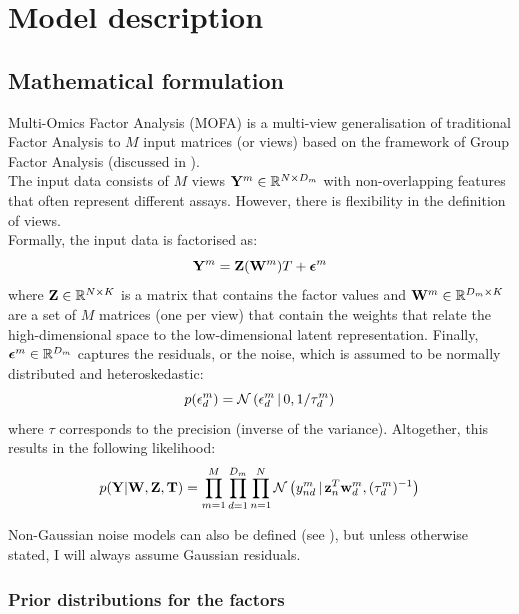 \graphicspath{{Chapter2/Figs/}}

\section{Model description} \label{mofa:model_description}

\subsection{Mathematical formulation}

Multi-Omics Factor Analysis (MOFA) is a multi-view generalisation of traditional Factor Analysis to $M$ input matrices (or views) based on the framework of Group Factor Analysis (discussed in ).\\
The input data consists of $M$ views ${\bf Y}^m \in \mathbb{R}^{N \times D_m}$ with non-overlapping features that often represent different assays. However, there is flexibility in the definition of views.\\
Formally, the input data is factorised as:
\begin{equation} \label{mofa_master_equation}
	\mathbf{Y}^m = \mathbf{Z}(\mathbf{W}^{m}){T} + \mbox{\boldmath $\epsilon$}^m
\end{equation}
where ${\bf Z} \in \mathbb{R}^{N \times K}$ is a matrix that contains the factor values and ${\bf W}^m \in \mathbb{R}^{D_m \times K}$ are a set of $M$ matrices (one per view) that contain the weights that relate the high-dimensional space to the low-dimensional latent representation. Finally, $\mbox{\boldmath $\epsilon$}^m \in \mathbb{R}^{D_m}$ captures the residuals, or the noise, which is assumed to be normally distributed and heteroskedastic:
\begin{equation}
	p(\epsilon^{m}_{d}) = \mathcal{N}\left(\epsilon^{m}_{d} \,|\, 0,1/\tau_{d}^{m}\right)
\end{equation}
where $\tau$ corresponds to the precision (inverse of the variance). Altogether, this results in the following likelihood:
\begin{equation}
	p({\bf Y}|{\bf W},{\bf Z},\mbox{\boldmath $\mathrm{T}$}) = \prod_{m=1}^{M} \prod_{d=1}^{D_m} \prod_{n=1}^{N} \mathcal{N}\left(y_{nd}^m \,|\, {\bf z}_{n}^T{\bf w}_{d}^{m},(\tau_d^m)^{-1}\right)
\end{equation}

Non-Gaussian noise models can also be defined (see ), but unless otherwise stated, I will always assume Gaussian residuals.

\subsubsection{Prior distributions for the factors}  \label{section:mofa_factors}

